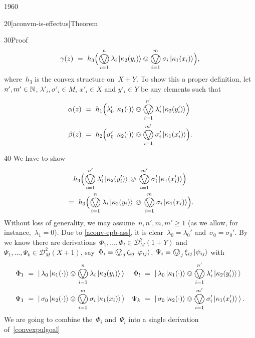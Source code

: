 \begin{parsec}{1960}
\begin{point}{20}[aconvm-is-effectus]{Theorem}
\begin{point}{30}{Proof}
\begin{equation}
    \gamma(z) \ = \  h_3 \Bigl(
    \bigovee^n_{i=1} \lambda_i \ket{\kappa_2(y_i)}
        \ovee \bigovee^m_{i=1} \sigma_i \ket{\kappa_1(x_i)}\Bigr),
\end{equation}
where~$h_3$ is the convex structure on~$X+Y$.
To show this a proper definition,
let~$n',m'\in \mathbb{N}$, $\lambda'_i, \sigma'_i \in M$,
$x'_i \in X$ and $y'_i \in Y$ be any elements such that
\begin{align*}
    \alpha(z) &\ =\ 
    h_1\Bigl(\lambda'_0 \ket{\kappa_1(\cdot)}
    \ovee \bigovee^{n'}_{i=1} \lambda'_i \ket{\kappa_2(y'_i)}\Bigr) \\
        \beta(z) &\ =\  h_2 \Bigl(\sigma'_0 \ket{\kappa_2(\cdot)}
    \ovee \bigovee^{m'}_{i=1} \sigma'_i \ket{\kappa_1(x'_i)}\Bigr).
\end{align*}
\spacingfix{}
\begin{point}{40}%
We have to show
\begin{multline}\label{convexpulgoal}
    h_3 \Bigl(
    \bigovee^{n'}_{i=1} \lambda'_i \ket{\kappa_2(y'_i)}
    \,\ovee\, \bigovee^{m'}_{i=1} \sigma'_i \ket{\kappa_1(x'_i)}\Bigr) \\
    \ = \ 
    h_3 \Bigl(
    \bigovee^n_{i=1} \lambda_i \ket{\kappa_2(y_i)}
        \,\ovee\, \bigovee^m_{i=1} \sigma_i \ket{\kappa_1(x_i)}\Bigr).
\end{multline}
Without loss of generality,
    we may assume~$n,n',m,m' \geq 1$
    (as we allow, for instance,~$\lambda_1=0$).
Due to \eqref{aconv-epb-ass},
 it is clear~$\lambda_0 = \lambda_0'$ and~$\sigma_0=\sigma_0'$.
By \sref{elements-coprod-conv}
    we know there
    are derivations~$\Phi_1, \ldots, \Phi_l \in \mathcal{D}_M^2 (1+Y)$
    and~$\Psi_1, \ldots, \Psi_k \in \mathcal{D}_M^2 (X+1)$,
    say~$\Phi_i \equiv \bigovee_j \zeta_{ij} \ket{\varphi_{ij}}$,
    $\Psi_i \equiv \bigovee_j \xi_{ij} \ket{\psi_{ij}}$
    with
\begin{align*}
    \Phi_1 &\ = \ \ket{\,
    \lambda_0 \ket{\kappa_1(\cdot)}
\ovee \bigovee^{n}_{i=1} \lambda_i \ket{\kappa_2(y_i)} \,} &
    \Phi_l &\ = \ \ket{\,
    \lambda_0 \ket{\kappa_1(\cdot)}
\ovee \bigovee^{n'}_{i=1} \lambda'_i \ket{\kappa_2(y'_i)} \,} \\
    \Psi_1 &\ = \ \ket{\,
    \sigma_0 \ket{\kappa_2(\cdot)}
\ovee \bigovee^{m}_{i=1} \sigma_i \ket{\kappa_1(x_i)} \,} &
    \Psi_k &\ = \ \ket{\,
    \sigma_0 \ket{\kappa_2(\cdot)}
\ovee \bigovee^{m'}_{i=1} \sigma'_i \ket{\kappa_1(x'_i)} \,}.
\end{align*}
We are going to combine the~$\Phi_i$ and~$\Psi_i$
into a single derivation of~\eqref{convexpulgoal}

\end{point}
\end{point}
\end{point}
\end{parsec}
